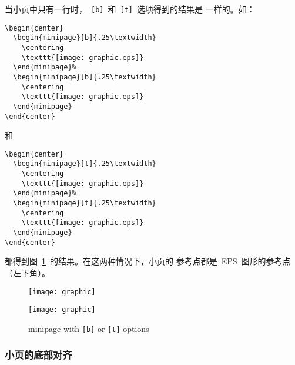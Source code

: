 当小页中只有一行时，~\texttt{[b]}~和~\texttt{[t]}~选项得到的结果是
一样的。如：
\begin{Verbatim}[xleftmargin=1cm]
\begin{center}
  \begin{minipage}[b]{.25\textwidth}
    \centering
    \texttt{[image: graphic.eps]}
  \end{minipage}%
  \begin{minipage}[b]{.25\textwidth}
    \centering
    \texttt{[image: graphic.eps]}
  \end{minipage}
\end{center}
\end{Verbatim}
和
\begin{Verbatim}[xleftmargin=1cm]
\begin{center}
  \begin{minipage}[t]{.25\textwidth}
    \centering
    \texttt{[image: graphic.eps]}
  \end{minipage}%
  \begin{minipage}[t]{.25\textwidth}
    \centering
    \texttt{[image: graphic.eps]}
  \end{minipage}
\end{center}
\end{Verbatim}
都得到图~\ref{fig:minipagesamp-1}~的结果。在这两种情况下，小页的
参考点都是~EPS~图形的参考点（左下角）。
\begin{figure}
\begin{center}
  \begin{minipage}[t]{.25\textwidth}
    \centering
    \texttt{[image: graphic]}
  \end{minipage}%
  \begin{minipage}[t]{.25\textwidth}
    \centering
    \texttt{[image: graphic]}
  \end{minipage}
\end{center}
\caption{minipage with \texttt{[b]} or \texttt{[t]} options}\label{fig:minipagesamp-1}
\end{figure}

\subsubsection{小页的底部对齐}

